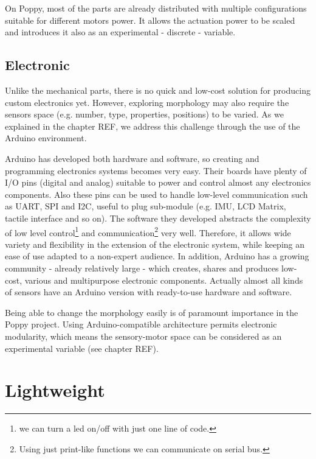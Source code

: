 On Poppy, most of the parts are already distributed with multiple configurations suitable for different motors power. It allows the actuation power to be scaled and introduces it also as an experimental - discrete - variable.


\subsection{Electronic} %

Unlike the mechanical parts, there is no quick and low-cost solution for producing custom electronics yet.
However, exploring morphology may also require the sensors space (e.g. number, type, properties, positions) to be varied. As we explained in the chapter REF, we address this challenge through the use of the Arduino environment.

Arduino has developed both hardware and software, so creating and programming electronics systems becomes very easy. Their boards have plenty of I/O pins (digital and analog) suitable to power and control almost any electronics components. Also these pins can be used to handle low-level communication such as UART, SPI and I2C, useful to plug sub-module (e.g. IMU, LCD Matrix, tactile interface and so on).
The software they developed abstracts the complexity of low level control\footnote{we can turn a led on/off with just one line of code.} and communication\footnote{Using just print-like functions we can communicate on serial bus.} very well. Therefore, it allows wide variety and flexibility in the extension of the electronic system, while keeping an ease of use adapted to a non-expert audience.
In addition, Arduino has a growing community - already relatively large - which creates, shares and produces low-cost, various and multipurpose electronic components. Actually almost all kinds of sensors have an Arduino version with ready-to-use hardware and software.

Being able to change the morphology easily is of paramount importance in the Poppy project. Using Arduino-compatible architecture permits electronic modularity, which means the sensory-motor space can be considered as an experimental variable (see chapter REF).


\section{Lightweight} %

